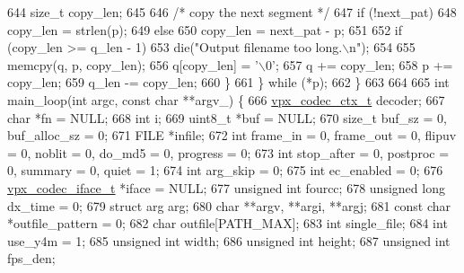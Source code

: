 \begin{DoxyCodeInclude}
{{{{{{{{{{{{{{{{{{{{{{{644       \textcolor{keywordtype}{size\_t} copy\_len;
645 
646       \textcolor{comment}{/* copy the next segment */}
647       \textcolor{keywordflow}{if} (!next\_pat)
648         copy\_len = strlen(p);
649       \textcolor{keywordflow}{else}
650         copy\_len = next\_pat - p;
651 
652       \textcolor{keywordflow}{if} (copy\_len >= q\_len - 1)
653         die(\textcolor{stringliteral}{"Output filename too long.\(\backslash\)n"});
654 
655       memcpy(q, p, copy\_len);
656       q[copy\_len] = \textcolor{charliteral}{'\(\backslash\)0'};
657       q += copy\_len;
658       p += copy\_len;
659       q\_len -= copy\_len;
660     \}
661   \} \textcolor{keywordflow}{while} (*p);
662 \}
663 
664 
665 \textcolor{keywordtype}{int} main\_loop(\textcolor{keywordtype}{int} argc, \textcolor{keyword}{const} \textcolor{keywordtype}{char} **argv\_) \{
666   \hyperlink{structvpx__codec__ctx}{vpx\_codec\_ctx\_t}          decoder;
667   \textcolor{keywordtype}{char}                  *fn = NULL;
668   \textcolor{keywordtype}{int}                    i;
669   uint8\_t               *buf = NULL;
670   \textcolor{keywordtype}{size\_t}                 buf\_sz = 0, buf\_alloc\_sz = 0;
671   FILE                  *infile;
672   \textcolor{keywordtype}{int}                    frame\_in = 0, frame\_out = 0, flipuv = 0, noblit = 0, do\_md5 = 0, progress = 0;
673   \textcolor{keywordtype}{int}                    stop\_after = 0, postproc = 0, summary = 0, quiet = 1;
674   \textcolor{keywordtype}{int}                    arg\_skip = 0;
675   \textcolor{keywordtype}{int}                    ec\_enabled = 0;
676   \hyperlink{group__codec_gae99c3b04f4a567a311211cce3ae6b83b}{vpx\_codec\_iface\_t}       *iface = NULL;
677   \textcolor{keywordtype}{unsigned} \textcolor{keywordtype}{int}           fourcc;
678   \textcolor{keywordtype}{unsigned} \textcolor{keywordtype}{long}          dx\_time = 0;
679   \textcolor{keyword}{struct }arg               arg;
680   \textcolor{keywordtype}{char}                   **argv, **argi, **argj;
681   \textcolor{keyword}{const} \textcolor{keywordtype}{char}             *outfile\_pattern = 0;
682   \textcolor{keywordtype}{char}                    outfile[PATH\_MAX];
683   \textcolor{keywordtype}{int}                     single\_file;
684   \textcolor{keywordtype}{int}                     use\_y4m = 1;
685   \textcolor{keywordtype}{unsigned} \textcolor{keywordtype}{int}            width;
686   \textcolor{keywordtype}{unsigned} \textcolor{keywordtype}{int}            height;
687   \textcolor{keywordtype}{unsigned} \textcolor{keywordtype}{int}            fps\_den;
}}}}}}}}}}}}}}}}}}}}}}}
\end{DoxyCodeInclude}
